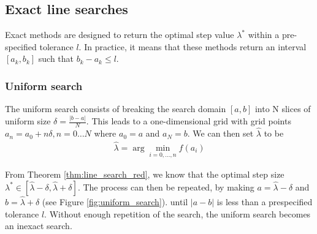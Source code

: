 \subsection{Exact line searches}

Exact methods are designed to return the optimal step value $\lambda^*$ within a pre-specified tolerance $l$. In practice, it means that these methods return an interval $[a_k, b_k]$ such that $b_k - a_k \leq l$. 

\subsubsection{Uniform search}

The uniform search consists of breaking the search domain $[a,b]$ into N slices of uniform size $\delta = \frac{\lvert b-a \rvert}{N}$. This leads to a one-dimensional grid with grid points $a_n = a_0 + n\delta, n = 0 \dots N$ where $a_0 = a$ and $a_N = b$. We can then set $\hat{\lambda}$ to be
\begin{align*}
\hat{\lambda} = \arg\min_{i=0,\dots,n} f(a_i) 
\end{align*}

From Theorem \ref{thm:line_search_red}, we know that the optimal step size $\lambda^* \in [\hat{\lambda} -\delta, \hat{\lambda} + \delta]$. The process can then be repeated, by making $a = \hat{\lambda} -\delta$ and $b = \hat{\lambda} + \delta$ (see Figure \ref{fig:uniform_search}). until $|a - b|$ is less than a prespecified tolerance $l$. Without enough repetition of the search, the uniform search becomes an inexact search. 

